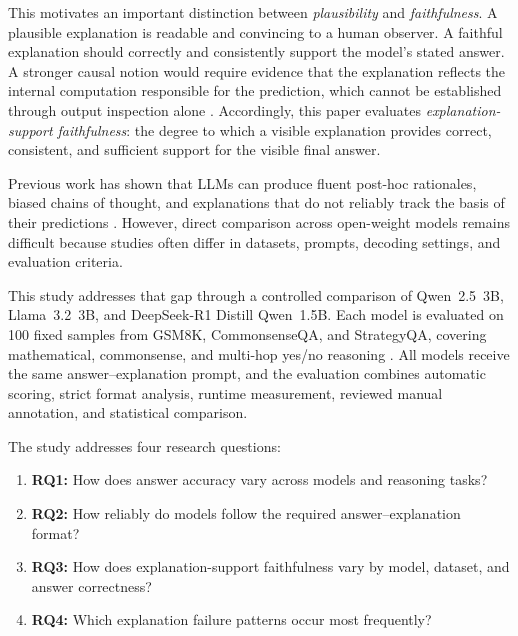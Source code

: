 \documentclass{article}
\begin{document}
This motivates an important distinction between
\emph{plausibility} and \emph{faithfulness}. A plausible explanation is
readable and convincing to a human observer. A faithful explanation
should correctly and consistently support the model's stated answer.
A stronger causal notion would require evidence that the explanation
reflects the internal computation responsible for the prediction, which
cannot be established through output inspection alone
\cite{turpin2023language,lanham2023measuring,
parcalabescu2024measuring}. Accordingly, this paper evaluates
\emph{explanation-support faithfulness}: the degree to which a visible
explanation provides correct, consistent, and sufficient support for
the visible final answer.

Previous work has shown that LLMs can produce fluent post-hoc rationales,
biased chains of thought, and explanations that do not reliably track
the basis of their predictions
\cite{madsen2024selfexplanations,paul2024making,
matton2025walk,zaman2025causal}. However, direct comparison across
open-weight models remains difficult because studies often differ in
datasets, prompts, decoding settings, and evaluation criteria.

This study addresses that gap through a controlled comparison of
Qwen~2.5~3B, Llama~3.2~3B, and DeepSeek-R1 Distill Qwen~1.5B.
Each model is evaluated on 100 fixed samples from GSM8K,
CommonsenseQA, and StrategyQA, covering mathematical, commonsense, and
multi-hop yes/no reasoning
\cite{cobbe2021gsm8k,talmor2019commonsenseqa,geva2021strategyqa}.
All models receive the same answer--explanation prompt, and the
evaluation combines automatic scoring, strict format analysis, runtime
measurement, reviewed manual annotation, and statistical comparison.

The study addresses four research questions:

\begin{enumerate}
    \item \textbf{RQ1:} How does answer accuracy vary across models and
    reasoning tasks?

    \item \textbf{RQ2:} How reliably do models follow the required
    answer--explanation format?

    \item \textbf{RQ3:} How does explanation-support faithfulness vary
    by model, dataset, and answer correctness?

    \item \textbf{RQ4:} Which explanation failure patterns occur most
    frequently?
\end{enumerate}
\end{document}
